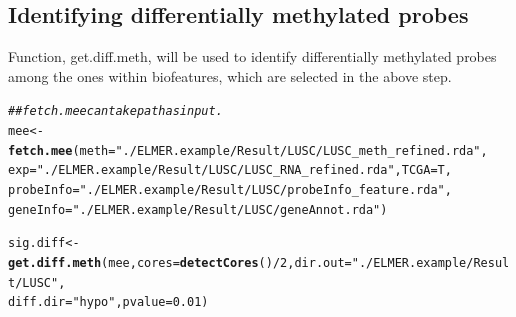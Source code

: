 \documentclass{article}\usepackage[]{graphicx}\usepackage[usenames,dvipsnames]{color}
\makeatletter
\newcommand{\hlnum}[1]{\textcolor[rgb]{0.686,0.059,0.569}{#1}}%
\newcommand{\hlstr}[1]{\textcolor[rgb]{0.192,0.494,0.8}{#1}}%
\newcommand{\hlcom}[1]{\textcolor[rgb]{0.678,0.584,0.686}{\textit{#1}}}%
\newcommand{\hlopt}[1]{\textcolor[rgb]{0,0,0}{#1}}%
\newcommand{\hlstd}[1]{\textcolor[rgb]{0.345,0.345,0.345}{#1}}%
\newcommand{\hlkwb}[1]{\textcolor[rgb]{0.69,0.353,0.396}{#1}}%
\newcommand{\hlkwc}[1]{\textcolor[rgb]{0.333,0.667,0.333}{#1}}%
\newcommand{\hlkwd}[1]{\textcolor[rgb]{0.737,0.353,0.396}{\textbf{#1}}}%
\newenvironment{kframe}{%
 \def\at@end@of@kframe{}%
 \ifinner\ifhmode%
  \def\at@end@of@kframe{\end{minipage}}%
  \begin{minipage}{\columnwidth}%
 \fi\fi%
 \def\FrameCommand##1{\hskip\@totalleftmargin \hskip-\fboxsep
 \colorbox{shadecolor}{##1}\hskip-\fboxsep
     \hskip-\linewidth \hskip-\@totalleftmargin \hskip\columnwidth}%
 \MakeFramed {\advance\hsize-\width
   \@totalleftmargin\z@ \linewidth\hsize
   \@setminipage}}%
 {\par\unskip\endMakeFramed%
 \at@end@of@kframe}
\newenvironment{knitrout}{}{} %
\makeatother
\begin{document}
\subsection{Identifying differentially methylated probes}
Function, get.diff.meth, will be used to identify differentially methylated 
probes among the ones within biofeatures, which are selected in the above step. 
\begin{knitrout}
\color{fgcolor}\begin{kframe}
\begin{alltt}
\hlcom{## fetch.mee can take path as input.}
\hlstd{mee} \hlkwb{<-} \hlkwd{fetch.mee}\hlstd{(}\hlkwc{meth}\hlstd{=}\hlstr{"./ELMER.example/Result/LUSC/LUSC_meth_refined.rda"}\hlstd{,}
                 \hlkwc{exp}\hlstd{=}\hlstr{"./ELMER.example/Result/LUSC/LUSC_RNA_refined.rda"}\hlstd{,} \hlkwc{TCGA}\hlstd{=T,}
                 \hlkwc{probeInfo}\hlstd{=}\hlstr{"./ELMER.example/Result/LUSC/probeInfo_feature.rda"}\hlstd{,}
                 \hlkwc{geneInfo}\hlstd{=}\hlstr{"./ELMER.example/Result/LUSC/geneAnnot.rda"}\hlstd{)}
\end{alltt}


{\ttfamily\noindent\itshape{}}\begin{alltt}
\hlstd{sig.diff} \hlkwb{<-} \hlkwd{get.diff.meth}\hlstd{(mee,} \hlkwc{cores}\hlstd{=}\hlkwd{detectCores}\hlstd{()}\hlopt{/}\hlnum{2}\hlstd{,} \hlkwc{dir.out} \hlstd{=}\hlstr{"./ELMER.example/Result/LUSC"}\hlstd{,}
                          \hlkwc{diff.dir}\hlstd{=}\hlstr{"hypo"}\hlstd{,} \hlkwc{pvalue} \hlstd{=} \hlnum{0.01}\hlstd{)}


\end{alltt}
\end{kframe}
\end{knitrout}
\end{document}

